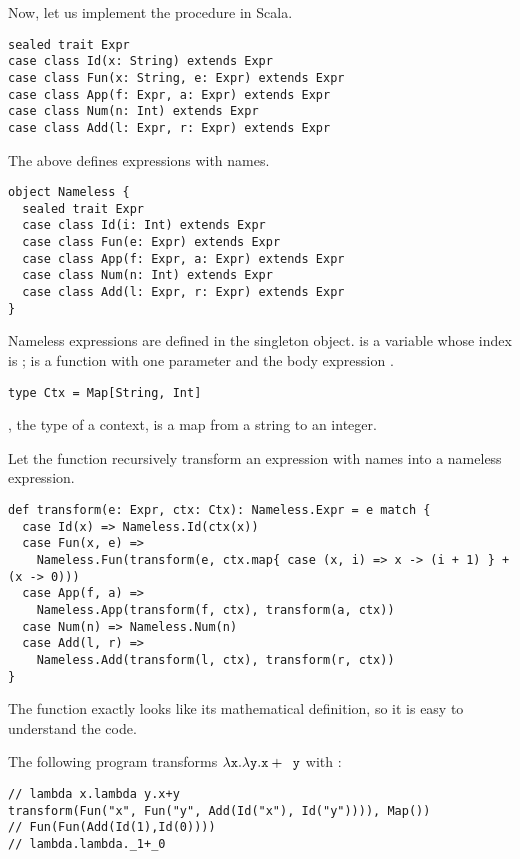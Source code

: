 Now, let us implement the procedure in Scala.

\begin{verbatim}
sealed trait Expr
case class Id(x: String) extends Expr
case class Fun(x: String, e: Expr) extends Expr
case class App(f: Expr, a: Expr) extends Expr
case class Num(n: Int) extends Expr
case class Add(l: Expr, r: Expr) extends Expr
\end{verbatim}

The above defines expressions with names.

\begin{verbatim}
object Nameless {
  sealed trait Expr
  case class Id(i: Int) extends Expr
  case class Fun(e: Expr) extends Expr
  case class App(f: Expr, a: Expr) extends Expr
  case class Num(n: Int) extends Expr
  case class Add(l: Expr, r: Expr) extends Expr
}
\end{verbatim}

Nameless expressions are defined in the  singleton object.
 is a variable whose index is ;  is a function
with one parameter and the body expression .

\begin{verbatim}
type Ctx = Map[String, Int]
\end{verbatim}

, the type of a context, is a map from a string to an integer.

Let the  function recursively transform an expression with names
into a nameless expression.

\begin{verbatim}
def transform(e: Expr, ctx: Ctx): Nameless.Expr = e match {
  case Id(x) => Nameless.Id(ctx(x))
  case Fun(x, e) =>
    Nameless.Fun(transform(e, ctx.map{ case (x, i) => x -> (i + 1) } + (x -> 0)))
  case App(f, a) =>
    Nameless.App(transform(f, ctx), transform(a, ctx))
  case Num(n) => Nameless.Num(n)
  case Add(l, r) =>
    Nameless.Add(transform(l, ctx), transform(r, ctx))
}
\end{verbatim}

The function exactly looks like its mathematical definition, so it is easy to
understand the code.

The following program transforms $\lambda \texttt{x}.\lambda \texttt{y}.\texttt{x}+\texttt{
y}$ with :

\begin{verbatim}
// lambda x.lambda y.x+y
transform(Fun("x", Fun("y", Add(Id("x"), Id("y")))), Map())
// Fun(Fun(Add(Id(1),Id(0))))
// lambda.lambda._1+_0
\end{verbatim}

